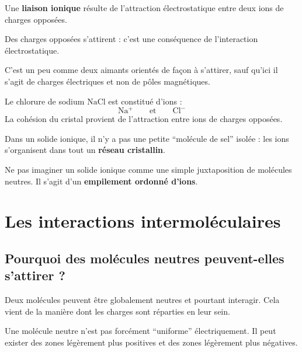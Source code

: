 \documentclass[11pt,a4paper]{article}
\begin{document}
\begin{definitionbox}
Une \textbf{liaison ionique} résulte de l’attraction électrostatique entre deux ions de charges opposées.
\end{definitionbox}

\begin{ideebox}
Des charges opposées s’attirent : c’est une conséquence de l’interaction électrostatique.
\end{ideebox}

\begin{analogebox}
C’est un peu comme deux aimants orientés de façon à s’attirer, sauf qu’ici il s’agit de charges électriques et non de pôles magnétiques.
\end{analogebox}

\begin{exemplebox}
Le chlorure de sodium \(\mathrm{NaCl}\) est constitué d’ions :
\[
\mathrm{Na^+} \qquad \text{et} \qquad \mathrm{Cl^-}
\]
La cohésion du cristal provient de l’attraction entre ions de charges opposées.
\end{exemplebox}

\begin{comprendrebox}
Dans un solide ionique, il n’y a pas une petite ``molécule de sel'' isolée : les ions s’organisent dans tout un \textbf{réseau cristallin}.
\end{comprendrebox}

\begin{attentionbox}
Ne pas imaginer un solide ionique comme une simple juxtaposition de molécules neutres.  
Il s’agit d’un \textbf{empilement ordonné d’ions}.
\end{attentionbox}

\section{Les interactions intermoléculaires}

\subsection{Pourquoi des molécules neutres peuvent-elles s’attirer ?}

Deux molécules peuvent être globalement neutres et pourtant interagir.  
Cela vient de la manière dont les charges sont réparties en leur sein.

\begin{ideebox}
Une molécule neutre n’est pas forcément ``uniforme'' électriquement.  
Il peut exister des zones légèrement plus positives et des zones légèrement plus négatives.
\end{ideebox}
\end{document}
